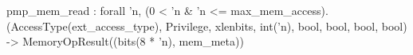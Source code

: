 pmp_mem_read : forall 'n, (0 < 'n & 'n <= max_mem_access).
  (AccessType(ext_access_type), Privilege, xlenbits, int('n), bool, bool, bool, bool) -> MemoryOpResult((bits(8 * 'n), mem_meta))